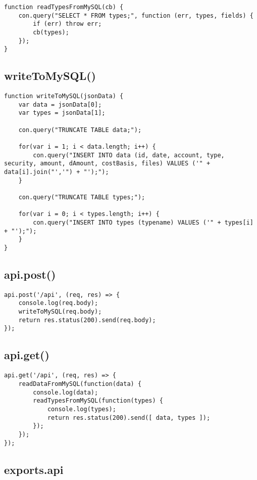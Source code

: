 \documentclass[letterpaper]{article}
\begin{document}
\begin{lstlisting}[firstnumber=27]
function readTypesFromMySQL(cb) {
    con.query("SELECT * FROM types;", function (err, types, fields) {
        if (err) throw err;
        cb(types);
    });
}
\end{lstlisting}

\subsection{writeToMySQL()}

\begin{lstlisting}[firstnumber=34]
function writeToMySQL(jsonData) {
    var data = jsonData[0];
    var types = jsonData[1];

    con.query("TRUNCATE TABLE data;");

    for(var i = 1; i < data.length; i++) {
        con.query("INSERT INTO data (id, date, account, type, security, amount, dAmount, costBasis, files) VALUES ('" + data[i].join("','") + "');");
    }

    con.query("TRUNCATE TABLE types;");

    for(var i = 0; i < types.length; i++) {
        con.query("INSERT INTO types (typename) VALUES ('" + types[i] + "');");
    }
}
\end{lstlisting}

\subsection{api.post()}

\begin{lstlisting}[firstnumber=51]
api.post('/api', (req, res) => {
    console.log(req.body);
    writeToMySQL(req.body);
    return res.status(200).send(req.body);
});
\end{lstlisting}

\subsection{api.get()}

\begin{lstlisting}[firstnumber=57]
api.get('/api', (req, res) => {
    readDataFromMySQL(function(data) {
        console.log(data);
        readTypesFromMySQL(function(types) {
            console.log(types);
            return res.status(200).send([ data, types ]);
        });
    });
});
\end{lstlisting}

\subsection{exports.api}
\end{document}
